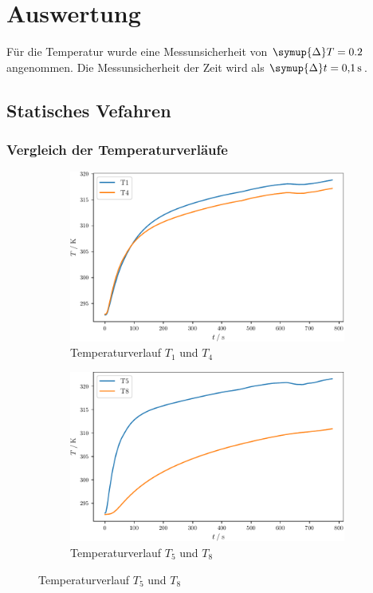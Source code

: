 \section{Auswertung}
\label{sec:Auswertung}
Für die Temperatur wurde eine Messunsicherheit von $\symup{\Delta} T = 0.2$ angenommen. Die Messunsicherheit der Zeit wird als $\symup{\Delta} t = \SI{0.1}{\second}$.
\subsection{Statisches Vefahren}  
\subsubsection{Vergleich der Temperaturverläufe}
\begin{figure}
  \begin{subfigure}{0.48\textwidth}
    \centering
    \includegraphics[width = \textwidth]{build/stat14.pdf}
    \caption{Temperaturverlauf $T_1$ und $T_4$}
    \label{fig:stat14}
  \end{subfigure}
  \begin{subfigure}{0.48\textwidth}
    \centering
    \includegraphics[width = \textwidth]{build/stat58.pdf}
    \caption{Temperaturverlauf $T_5$ und $T_8$}
    \label{fig:stat58}
  \end{subfigure}
\end{figure}
